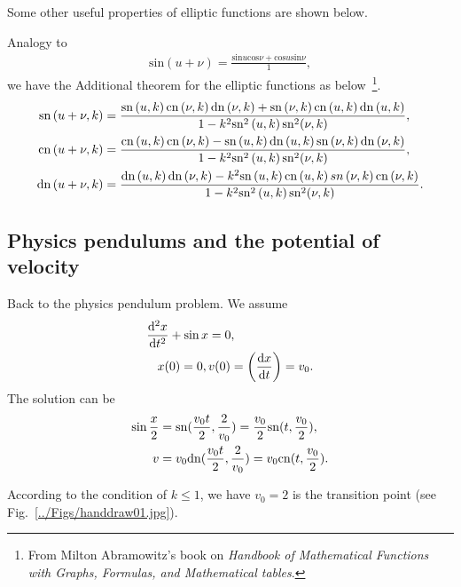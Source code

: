 Some other useful properties of elliptic functions are shown below. 

Analogy to 
\begin{align}
\mathrm{sin}\left(u+\nu \right) =\frac{\mathrm{sin}u\mathrm{cos}\nu +\mathrm{cos}u\mathrm{sin}\nu }{1},
\end{align} we have the Additional theorem for the elliptic functions as below~\footnote{From Milton Abramowitz's book on \textit{Handbook of Mathematical Functions with Graphs, Formulas, and Mathematical tables}.}.
\begin{align}
\mathrm{\mathrm{sn}}\left(u+\nu ,k\right) &=\frac{\mathrm{sn}\left(u,k\right) {\mathrm{cn}} \left(\nu ,k\right)\mathrm{dn}\left(\nu ,k\right)+\mathrm{sn}\left(\nu ,k\right)\mathrm{cn}\left(u,k\right)\mathrm{dn}\left(u,k\right)}{1-{k}^{2}\mathrm{sn}^{2}\left(u,k\right)\mathrm{sn}^{2}{\left(\nu ,k\right)}},\\
\mathrm{\mathrm{cn}}\left(u+\nu ,k\right) &=\frac{\mathrm{cn}\left(u,k\right) {\mathrm{cn}} \left(\nu ,k\right)-\mathrm{sn}\left(u ,k\right)\mathrm{dn}\left(u,k\right)\mathrm{sn}\left(\nu,k\right)\mathrm{dn}\left(\nu,k\right)}{1-{k}^{2}\mathrm{sn}^{2}\left(u,k\right)\mathrm{sn}^{2}{\left(\nu ,k\right)}},\\
\mathrm{\mathrm{dn}}\left(u+\nu ,k\right) &=\frac{\mathrm{dn}\left(u,k\right) {\mathrm{dn}} \left(\nu ,k\right)- k^2 \mathrm{sn}\left(u ,k\right)\mathrm{cn}\left(u,k\right)sn\left(\nu,k\right)\mathrm{cn}\left(\nu,k\right)}{1-{k}^{2}\mathrm{sn}^{2}\left(u,k\right)\mathrm{sn}^{2}{\left(\nu ,k\right)}}.
\end{align}

\subsection{Physics pendulums and the potential of velocity}\label{sec:pendulum}
Back to the physics pendulum problem. We assume
\begin{align}
\frac{{\mathrm d}^2 {x}}{{\mathrm d}t^2}+\sin x &=0, \label{sinxd}\\
x(0)=0, \, & v(0)=\left( \frac{{\mathrm d} {x}}{{\mathrm d}t}\right) = v_0.
\end{align}
The solution can be
\begin{align}
\sin\frac{x}{2} &= \mathrm{sn}(\frac{v_0 t}{2},\frac{2}{v_0})=\frac{v_0}{2} \mathrm{sn}(t,\frac{v_0}{2}),\\
v &=v_0 \mathrm{dn}(\frac{v_0 t}{2} , \frac{2}{v_0})= v_0 \mathrm{cn}(t,\frac{v_0}{2}).
\end{align}

According to the condition of $ k\leq 1 $, we have $v_0=2$ is the
transition point (see Fig.~\ref{../Figs/handdraw01.jpg}).

